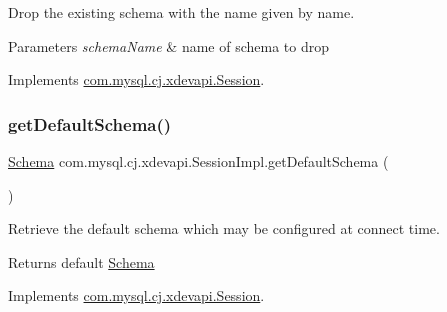 Drop the existing schema with the name given by name.


\begin{DoxyParams}{Parameters}
{\em schema\+Name} & name of schema to drop \\
\hline
\end{DoxyParams}


Implements \mbox{\hyperlink{interfacecom_1_1mysql_1_1cj_1_1xdevapi_1_1_session_af292b70a8b7a6a159e98d36a2729b0e7}{com.\+mysql.\+cj.\+xdevapi.\+Session}}.

\mbox{\label{classcom_1_1mysql_1_1cj_1_1xdevapi_1_1_session_impl_adba641099e94d53a50b08abc745d761b}} 
\subsubsection{\texorpdfstring{get\+Default\+Schema()}{getDefaultSchema()}}
{\footnotesize\ttfamily \mbox{\hyperlink{interfacecom_1_1mysql_1_1cj_1_1xdevapi_1_1_schema}{Schema}} com.\+mysql.\+cj.\+xdevapi.\+Session\+Impl.\+get\+Default\+Schema (\begin{DoxyParamCaption}{ }\end{DoxyParamCaption})}

Retrieve the default schema which may be configured at connect time.

\begin{DoxyReturn}{Returns}
default \mbox{\hyperlink{interfacecom_1_1mysql_1_1cj_1_1xdevapi_1_1_schema}{Schema}} 
\end{DoxyReturn}


Implements \mbox{\hyperlink{interfacecom_1_1mysql_1_1cj_1_1xdevapi_1_1_session_a8ead4f7e01e906447c15d9e6ce38ead2}{com.\+mysql.\+cj.\+xdevapi.\+Session}}.

\mbox{\label{classcom_1_1mysql_1_1cj_1_1xdevapi_1_1_session_impl_a4aa237ed5d2cfe61c302a11907533b61}} 
